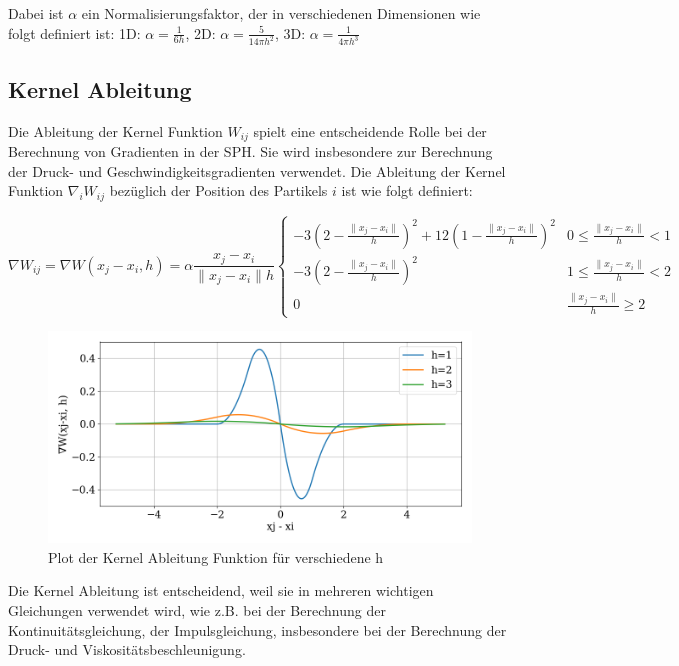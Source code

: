\documentclass[a4paper, 12pt]{article}
\begin{document}
Dabei ist \(\alpha\) ein Normalisierungsfaktor, der in verschiedenen Dimensionen wie folgt definiert ist:
1D: \(\alpha = \frac{1}{6h}\), 2D: \(\alpha = \frac{5}{14\pi h^2}\), 3D: \(\alpha = \frac{1}{4\pi h^3}\)

\subsection{Kernel Ableitung}
Die Ableitung der Kernel Funktion $W_{ij}$ spielt eine entscheidende Rolle bei der Berechnung von Gradienten in der SPH. Sie wird insbesondere zur Berechnung der Druck- und Geschwindigkeitsgradienten verwendet. Die Ableitung der Kernel Funktion $\nabla_i W_{ij}$ bezüglich der Position des Partikels $i$ ist wie folgt definiert:

\begin{equation*}
	\nabla W_{ij} = \nabla W(x_j - x_i, h) = \alpha \frac{x_j - x_i}{\|x_j - x_i\|h} 
	\begin{cases} 
	-3(2-\frac{\|x_j - x_i\|}{h})^2 + 12(1-\frac{\|x_j - x_i\|}{h})^2 & 0 \leq \frac{\|x_j - x_i\|}{h} < 1 \\ 
	-3(2-\frac{\|x_j - x_i\|}{h})^2 & 1 \leq \frac{\|x_j - x_i\|}{h} < 2 \\ 
	0 & \frac{\|x_j - x_i\|}{h} \geq 2 
	\end{cases}
\end{equation*}	

\begin{figure}[H]
	\centering
	\includegraphics[width=\textwidth]{graphics/KernelDerivPlot.png}
	\caption{Plot der Kernel Ableitung Funktion für verschiedene h}
\end{figure}

Die Kernel Ableitung ist entscheidend, weil sie in mehreren wichtigen Gleichungen verwendet wird, wie z.B. bei der Berechnung der Kontinuitätsgleichung, der Impulsgleichung, insbesondere bei der Berechnung der Druck- und Viskositätsbeschleunigung.
\end{document}
